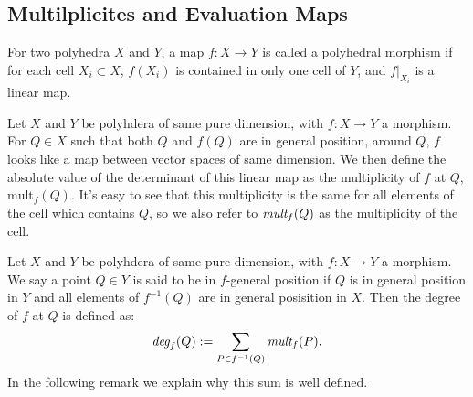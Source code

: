 \begin{example}[Looking at $M_{4}$]
    \begin{center}
    \end{center}
\end{example}


\subsection{Multilplicites and Evaluation Maps}

\begin{definition}
   For two polyhedra $X$ and $Y$, a map $f:X \to Y$ is called a polyhedral morphism if for each cell $X_{i}\subset X$, $f(X_{i})$ is contained in only one cell of $Y$, and $f|_{X_{i}}$ is a linear map. 
\end{definition}

\begin{definition}
    Let $X$ and $Y$ be polyhdera of same pure dimension, with $f:X\to Y$ a morphism. 
    For $Q\in X$ such that both $Q$ and $f(Q)$ are in general position, around $Q$, $f$ looks like a map between vector spaces of same dimension.
    We then define the absolute value of the determinant of this linear map as the multiplicity of $f$ at $Q$, $\text{mult}_{f}(Q)$.
    It's easy to see that this multiplicity is the same for all elements of the cell which contains $Q$, so we also refer to $\emph{mult}_{f}(Q)$ as the multiplicity of the cell.
\end{definition}

\begin{definition}
    Let $X$ and $Y$ be polyhdera of same pure dimension, with $f:X\to Y$ a morphism. 
    We say a point $Q \in Y$ is said to be in $f$-general position if $Q$ is in general position in $Y$ and all elements of $f^{-1}(Q)$ are in general posisition in $X$.
    Then the degree of $f$ at $Q$ is defined as:
    \[
        \emph{deg}_{f}(Q):= \sum_{P \in f^{-1}(Q)}\emph{mult}_{f}(P).
    \]
    In the following remark we explain why this sum is well defined.
\end{definition}

